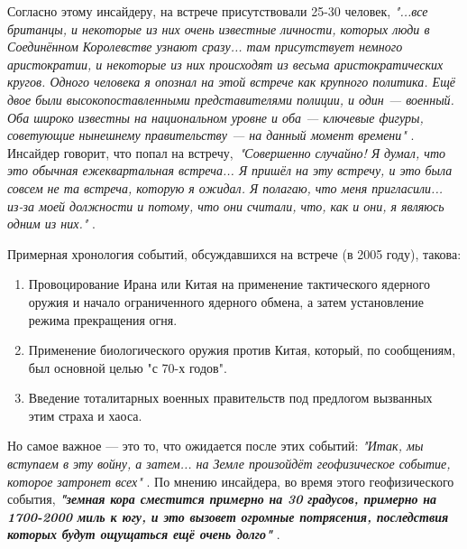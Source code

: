 \documentclass[10pt,twocolumn,letterpaper]{article}
\begin{document}
Согласно этому инсайдеру, на встрече присутствовали 25-30 человек, \textit{"...все британцы, и некоторые из них очень известные личности, которых люди в Соединённом Королевстве узнают сразу... там присутствует немного аристократии, и некоторые из них происходят из весьма аристократических кругов. Одного человека я опознал на этой встрече как крупного политика. Ещё двое были высокопоставленными представителями полиции, и один — военный. Оба широко известны на национальном уровне и оба — ключевые фигуры, советующие нынешнему правительству — на данный момент времени"} \cite{4}. Инсайдер говорит, что попал на встречу,\ \textit{"Совершенно случайно! Я думал, что это обычная ежеквартальная встреча... Я пришёл на эту встречу, и это была совсем не та встреча, которую я ожидал. Я полагаю, что меня пригласили... из-за моей должности и потому, что они считали, что, как и они, я являюсь одним из них."} \cite{4}.

Примерная хронология событий, обсуждавшихся на встрече (в 2005 году), такова:

\begin{flushleft}
\begin{enumerate}
    \item Провоцирование Ирана или Китая на применение тактического ядерного оружия и начало ограниченного ядерного обмена, а затем установление режима прекращения огня.
    \item Применение биологического оружия против Китая, который, по сообщениям, был основной целью "с 70-х годов".
    \item Введение тоталитарных военных правительств под предлогом вызванных этим страха и хаоса.
\end{enumerate}
\end{flushleft}

Но самое важное — это то, что ожидается после этих событий: \textit{"Итак, мы вступаем в эту войну, а затем... на Земле произойдёт геофизическое событие, которое затронет всех"} \cite{4}. По мнению инсайдера, во время этого геофизического события, \textit{\textbf{"земная кора сместится примерно на 30 градусов, примерно на 1700-2000 миль к югу, и это вызовет огромные потрясения, последствия которых будут ощущаться ещё очень долго"}} \cite{4}.
\end{document}
